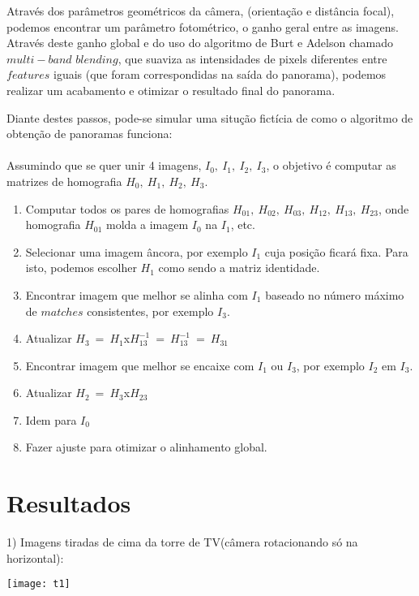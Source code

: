 \documentclass[conference]{IEEEtran}
\begin{document}
  Atrav\'es dos par\^ametros geom\'etricos da c\^amera, (orienta\c{c}\~ao e dist\^ancia focal), podemos encontrar um 
  par\^ametro fotom\'etrico, o ganho geral entre as imagens. Atrav\'es deste ganho global e do uso do algoritmo de Burt
  e Adelson chamado $multi-band$ $blending$, que suaviza as intensidades de pixels diferentes entre $features$ iguais (que 
  foram correspondidas na sa\'ida do panorama), podemos realizar um acabamento e otimizar o resultado final do panorama.
  
  Diante destes passos, pode-se simular uma situ\c{c}\~ao fict\'icia de como o algoritmo de obten\c{c}\~ao de panoramas funciona:
  \\\\
  Assumindo que se quer unir 4 imagens, $I_{0},\>I_{1},\>I_{2},\>I_{3}$, o objetivo \'e computar as matrizes de homografia
  $H_{0},\>H_{1},\>H_{2},\>H_{3}$.

\begin{enumerate}
	\item Computar todos os pares de homografias $H_{01},\>H_{02},\>H_{03},\>H_{12},\>H_{13},\>H_{23}$, onde homografia 
	 $H_{01} $ molda a imagem $I_{0}$ na $I_{1}$, etc.
	\item Selecionar uma imagem \^ancora, por exemplo $I_{1}$ cuja posi\c{c}\~ao ficar\'a fixa. Para isto, podemos escolher
	 $H_{1}$ como sendo a matriz identidade.
	\item Encontrar imagem que melhor se alinha com $I_{1}$ baseado no n\'umero m\'aximo de $matches$ consistentes, por
	 exemplo $I_{3}$.
	 \item Atualizar $H_{3}\>=\>H_{1}$x$H_{13}^{-1}\>=\>H_{13}^{-1}\>=\>H_{31}$
	 \item Encontrar imagem que melhor se encaixe com $I_{1}$ ou $I_{3}$, por exemplo $I_{2}$ em $I_{3}$.
	 \item Atualizar $H_{2}\>=\>H_{3}$x$H_{23}$
	 \item Idem para $I_{0}$
	 \item Fazer ajuste para otimizar o alinhamento global.
	 
\end{enumerate}	

\section{Resultados} 
\label{sec:meth} 
1) Imagens tiradas de cima da torre de TV(c\^amera rotacionando s\'o na horizontal):

		\vspace{2\baselineskip}\vspace{-\parskip}
		\begin{minipage}{\linewidth}
  		\centering
  		\texttt{[image: t1]}
		\end{minipage}
		
\end{document}
